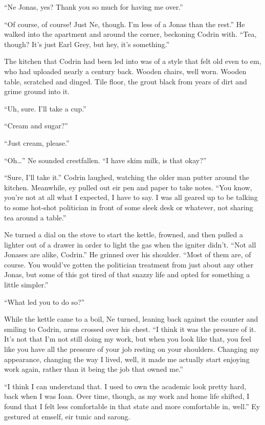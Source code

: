 ``Ne Jonas, yes? Thank you so much for having me over.''

``Of course, of course! Just Ne, though. I'm less of a Jonas than the rest.'' He walked into the apartment and around the corner, beckoning Codrin with. ``Tea, though? It's just Earl Grey, but hey, it's something.''

The kitchen that Codrin had been led into was of a style that felt old even to em, who had uploaded nearly a century back. Wooden chairs, well worn. Wooden table, scratched and dinged. Tile floor, the grout black from years of dirt and grime ground into it.

``Uh, sure. I'll take a cup.''

``Cream and sugar?''

``Just cream, please.''

``Oh\ldots{}'' Ne sounded crestfallen. ``I have skim milk, is that okay?''

``Sure, I'll take it.'' Codrin laughed, watching the older man putter around the kitchen. Meanwhile, ey pulled out eir pen and paper to take notes. ``You know, you're not at all what I expected, I have to say. I was all geared up to be talking to some hot-shot politician in front of some sleek desk or whatever, not sharing tea around a table.''

Ne turned a dial on the stove to start the kettle, frowned, and then pulled a lighter out of a drawer in order to light the gas when the igniter didn't. ``Not all Jonases are alike, Codrin.'' He grinned over his shoulder. ``Most of them are, of course. You would've gotten the politician treatment from just about any other Jonas, but some of this got tired of that snazzy life and opted for something a little simpler.''

``What led you to do so?''

While the kettle came to a boil, Ne turned, leaning back against the counter and smiling to Codrin, arms crossed over his chest. ``I think it was the pressure of it. It's not that I'm not still doing my work, but when you look like that, you feel like you have all the pressure of your job resting on your shoulders. Changing my appearance, changing the way I lived, well, it made me actually start enjoying work again, rather than it being the job that owned me.''

``I think I can understand that. I used to own the academic look pretty hard, back when I was Ioan. Over time, though, as my work and home life shifted, I found that I felt less comfortable in that state and more comfortable in, well.'' Ey gestured at emself, eir tunic and sarong.

